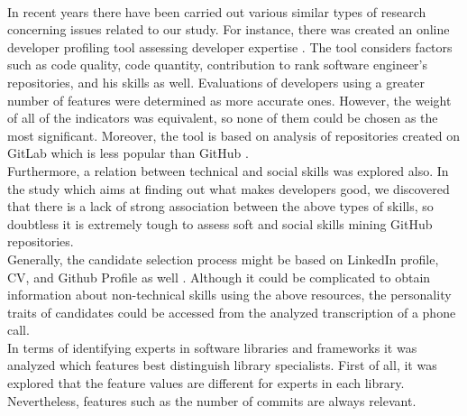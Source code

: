 \\In recent years there have been carried out various similar types of research concerning issues related to our study. For instance, there was created an online developer profiling tool assessing developer expertise \cite{GitLabProfilingTool}. The tool considers factors such as code quality, code quantity, contribution to rank software engineer’s repositories, and his skills as well. Evaluations of developers using a greater number of features were determined as more accurate ones. However, the weight of all of the indicators was equivalent, so none of them could be chosen as the most significant. Moreover, the tool is based on analysis of repositories created on GitLab which is less popular than GitHub \cite{GitLabvsGithub}.
\\Furthermore, a relation between technical and social skills \cite{WhatMakesGoodDev} was explored also. In the study which aims at finding out what makes developers good, we discovered that there is a lack of strong association between the above types of skills, so doubtless it is extremely tough to assess soft and social skills mining GitHub repositories.
\\Generally, the candidate selection process might be based on LinkedIn profile, CV, and Github Profile as well \cite{CandidateSelection}. Although it could be complicated to obtain information about non-technical skills using the above resources, the personality traits of candidates could be accessed from the analyzed transcription of a phone call.
\\In terms of identifying experts in software libraries and frameworks \cite{SoftwareLibraries} it was analyzed which features best distinguish library specialists. First of all, it was explored that the feature values are different for experts in each library. Nevertheless, features such as the number of commits are always relevant.
